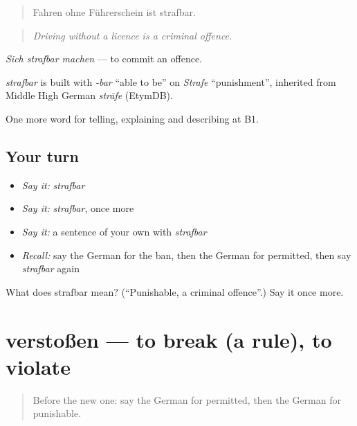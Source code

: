 \begin{quote}
Fahren ohne Führerschein ist strafbar.
\end{quote}

\begin{quote}
\emph{Driving without a licence is a criminal offence.}
\end{quote}

\emph{Sich strafbar machen} — to commit an offence.

\begin{cousinweb}
\emph{strafbar} is built with \emph{-bar} \textquotedblleft{}able to be\textquotedblright{} on \emph{Strafe} \textquotedblleft{}punishment\textquotedblright{}, inherited from Middle High German \emph{strāfe} (EtymDB).
\end{cousinweb}

\begin{grammarlens}[title={What you've built}]
One more word for telling, explaining and describing at B1.
\end{grammarlens}

\subsection*{Your turn}
\begin{itemize}
\raggedright
  \item \emph{Say it:} \emph{strafbar}
  \item \emph{Say it:} \emph{strafbar}, once more
  \item \emph{Say it:} a sentence of your own with \emph{strafbar}
  \item \emph{Recall:} say the German for the ban, then the German for permitted, then say \emph{strafbar} again
\end{itemize}

\begin{tcolorbox}[breakable,colback=teal!4,colframe=teal!35!black,title={Before you move on}]
What does strafbar mean? (\textquotedblleft{}Punishable, a criminal offence\textquotedblright{}.) Say it once more.
\end{tcolorbox}
\section[verstoßen]{verstoßen — to break (a rule), to violate}

\label{lesson:GE-C382-verstossen}



\begin{quote}
Before the new one: say the German for permitted, then the German for punishable.
\end{quote}

